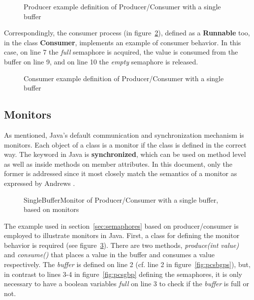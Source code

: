 \documentclass[11pt]{article} %
\begin{document}
\begin{figure}[h]

\caption{Producer example definition of Producer/Consumer with a single buffer}
\label{fig:pcsbproc}
\end{figure}

Correspondingly, the consumer process (in figure~\ref{fig:pcsbcons}), defined as a {\bfseries Runnable} too, in the class {\bfseries Consumer}, implements an example of consumer behavior. In this case, on line 7 the \emph{full} semaphore is acquired, the value is consumed from the buffer on line 9, and on line 10 the \emph{empty} semaphore is released. 

\begin{figure}[h]

\caption{Consumer example definition of Producer/Consumer with a single buffer}
\label{fig:pcsbcons}
\end{figure}

\subsection{Monitors}

As mentioned, Java's default communication and synchronization mechanism is monitors. Each object of a class is a monitor if the class is defined in the correct way. The keyword in Java is {\bfseries synchronized}, which can be used on method level as well as inside methods on member attributes. In this document, only the former is addressed since it most closely match the semantics of a monitor as expressed by Andrews \cite[ch. 5]{andrews_foundations_2000}. 

\lstset{inputpath=c:/git/IT325G/IT325G/examples/se/his/iit/it325g/examples/monitors/multipleProducerConsumerSingleBuffer}
\begin{figure}[ht]

\caption{SingleBufferMonitor of Producer/Consumer with a single buffer, based on monitors}
\label{fig:pcsbsbm-monitor}
\end{figure}

The example used in section~\ref{sec:semaphores} based on producer/consumer is employed to illustrate monitors in Java. First, a class for defining the monitor behavior is required (see figure~\ref{fig:pcsbsbm-monitor}). There are two methods, \emph{produce(int value)} and \emph{consume()} that places a value in the buffer and consumes a value respectively. The \emph{buffer} is defined on line 2 (cf. line 2 in figure~\ref{fig:pcsbgps}), but, in contrast to lines 3-4 in figure~\ref{fig:pcsgbp} defining the semaphores, it is only necessary to have a boolean variables \emph{full} on line 3 to check if the \emph{buffer} is full or not. 
\end{document}
